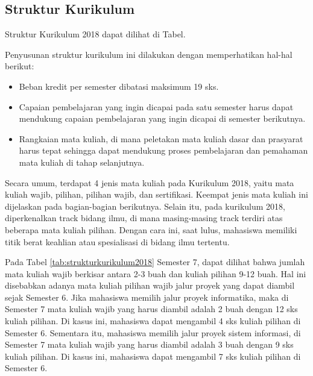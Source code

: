 \subsection{Struktur Kurikulum}

Struktur Kurikulum 2018 dapat dilihat di Tabel.

Penyusunan struktur kurikulum ini dilakukan dengan memperhatikan hal-hal berikut:
\begin{itemize}
	\item Beban kredit per semester dibatasi maksimum 19 sks.
	\item Capaian pembelajaran yang ingin dicapai pada satu semester harus dapat mendukung capaian pembelajaran yang ingin dicapai di semester berikutnya.
	\item Rangkaian mata kuliah, di mana peletakan mata kuliah dasar dan prasyarat harus tepat sehingga dapat mendukung proses pembelajaran dan pemahaman mata kuliah di tahap selanjutnya. 
\end{itemize}
Secara umum, terdapat 4 jenis mata kuliah pada Kurikulum 2018, yaitu mata kuliah wajib, pilihan, pilihan wajib, dan sertifikasi. Keempat jenis mata kuliah ini dijelaskan pada bagian-bagian berikutnya. Selain itu, pada kurikulum 2018, diperkenalkan track bidang ilmu, di mana masing-masing track terdiri atas beberapa mata kuliah pilihan. Dengan cara ini, saat lulus, mahasiswa memiliki titik berat keahlian atau spesialisasi di bidang ilmu tertentu.

Pada Tabel \ref{tab:strukturkurikulum2018} Semester 7, dapat dilihat bahwa jumlah mata kuliah wajib berkisar antara 2-3 buah dan kuliah pilihan 9-12 buah. Hal ini disebabkan adanya mata kuliah pilihan wajib jalur proyek yang dapat diambil sejak Semester 6. Jika mahasiswa memilih jalur proyek informatika, maka di Semester 7 mata kuliah wajib yang harus diambil adalah 2 buah dengan 12 sks kuliah pilihan. Di kasus ini, mahasiswa dapat mengambil 4 sks kuliah pilihan di Semester 6. Sementara itu, mahasiswa memilih jalur proyek sistem informasi, di Semester 7 mata kuliah wajib yang harus diambil adalah 3 buah dengan 9 sks kuliah pilihan. Di kasus ini, mahasiswa dapat mengambil 7 sks kuliah pilihan di Semester 6.


